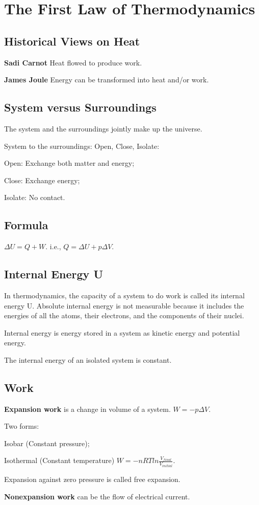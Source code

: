 \documentclass[a4paper,12pt]{article}
\begin{document}
\newpage
\section{The First Law of Thermodynamics}
\subsection{Historical Views on Heat}
\textbf{Sadi Carnot} Heat flowed to produce work.\par
\textbf{James Joule} Energy can be transformed into heat and/or work.\par
\subsection{System versus Surroundings}
The system and the surroundings jointly make up the universe.\par
System to the surroundings: Open, Close, Isolate:\par
Open: Exchange both matter and energy;\par
Close: Exchange energy;\par
Isolate: No contact.
\subsection{Formula}
$\Delta U = Q + W$. i.e., $Q=\Delta U+p\Delta V$.
\subsection{Internal Energy U}
In thermodynamics, the capacity of a system to do work is called its internal energy U. Absolute internal energy is not measurable because it includes the energies of all the atoms, their electrons, and the components of their nuclei.\par
Internal energy is energy stored in a system as kinetic energy and potential energy.\par
The internal energy of an isolated system is constant.
\subsection{Work}
\textbf{Expansion work} is a change in volume of a system. $W=-p\Delta V$.\par
Two forms:\par Isobar (Constant pressure);\par Isothermal (Constant temperature) $W=-nRTln\frac{V_{final}}{V_{initial}}$.\par
Expansion against zero pressure is called free expansion.\par
\textbf{Nonexpansion work} can be the flow of electrical current.
\end{document}
